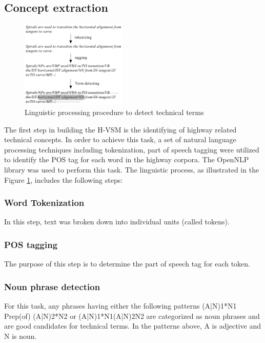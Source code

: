 \documentclass[NewProceedings, InsideFigs]{ascelike} %
\begin{document}
\subsection{Concept extraction}

\begin{figure}[t]
\centering
\includegraphics[width=0.45\textwidth]{NP_detecting}
\caption{Linguistic processing procedure to detect technical terms}
\label{fig:np_detect}
\end{figure}

The first step in building the H-VSM is the identifying of highway related technical concepts. In order to achieve this task, a set of natural language processing techniques including tokenization, part of speech tagging were utilized to identify the POS tag for each word in the highway corpora. The OpenNLP library was used to perform this task. The linguistic process, as illustrated in the Figure \ref{fig:np_detect}, includes the following steps:

\subsubsection{Word Tokenization} 
In this step, text was broken down into individual units (called tokens). 
\subsubsection{POS tagging} 
The purpose of this step is to determine the part of speech tag for each token. 
\subsubsection{Noun phrase detection}
For this task, any phrases having either the following patterns (A|N)1*N1 Prep(of) (A|N)2*N2 or (A|N)1*N1(A|N)2N2 are categorized as noun phrases and are good candidates for technical terms. In the patterns above, A is adjective and N is noun. 
\end{document}
